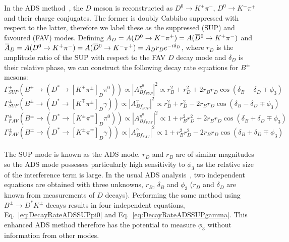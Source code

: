 \documentclass[oneside,12pt]{article}
\newcommand{\overbar}[1]{\mkern 1.5mu\overline{\mkern-1.5mu#1\mkern-1.5mu}\mkern
1.5mu}
\begin{document}
In the ADS method~\cite{ADSRef}, the $D$ meson is reconstructed as
$D^{0}\rightarrow K^{+}\pi^{-}$, $D^{0}\rightarrow K^{-}\pi^{+}$ and their
charge conjugates. The former is doubly Cabbibo suppressed with respect to the
latter, therefore we label these as the suppressed (SUP) and favoured (FAV)
modes. Defining $A_{D}=A(D^{0}\rightarrow
K^{-}\pi^{+})=A(\overbar{D}^{0}\rightarrow K^{+}\pi^{-})$ and $\overbar{A}_{D}=
A(D^{0}\rightarrow K^{+}\pi^{-})=A(\overbar{D}^{0}\rightarrow
K^{-}\pi^{+})=A_{D}r_{D}e^{-i\delta_{D}}$, where $r_{D}$ is the amplitude ratio
of the SUP with respect to the FAV $D$ decay mode and $\delta_{D}$ is their
relative phase, we can construct the following decay rate equations for
$B^{\pm}$ mesons:
  \begin{equation}
		\Gamma_{SUP}^{\pm}(B^{\pm}\rightarrow (D^{*}\rightarrow
[K^{\mp}\pi^{\pm}]_D\pi^{0}))\propto |A^{\pi^0}_{Bf_{SUP}}|^2 \propto r_{B}^{2}
+ r_{D}^{2} + 2r_{B}r_{D}\cos(\delta_{B} - \delta_{D} \mp \phi_{3})
\label{eq:DecayRateADSSUPpi0}
  \end{equation}
  \begin{equation}
		\Gamma_{SUP}^{\pm}(B^{\pm}\rightarrow (D^{*}\rightarrow
[K^{\mp}\pi^{\pm}]_D\gamma))\propto |A^{\gamma}_{Bf_{SUP}}|^2 \propto r_{B}^{2}
+ r_{D}^{2} - 2r_{B}r_{D}\cos(\delta_{B} - \delta_{D} \mp \phi_{3})
\label{eq:DecayRateADSSUPgamma}
  \end{equation}
  \begin{equation}
		\Gamma_{FAV}^{\pm}(B^{\pm}\rightarrow (D^{*}\rightarrow
[K^{\pm}\pi^{\mp}]_D\pi^{0}))\propto |A^{\pi^0}_{Bf_{FAV}}|^2 \propto 1 +
r_{B}^{2}r_{D}^{2} + 2r_{B}r_{D}\cos(\delta_{B} + \delta_{D} \mp \phi_{3})
\label{eq:DecayRateADSFAVpi0}
  \end{equation}
  \begin{equation}
		\Gamma_{FAV}^{\pm}(B^{\pm}\rightarrow (D^{*}\rightarrow
[K^{\pm}\pi^{\mp}]_D\gamma))\propto |A^{\gamma}_{Bf_{FAV}}|^2 \propto 1 +
r_{B}^{2}r_{D}^{2} - 2r_{B}r_{D}\cos(\delta_{B} + \delta_{D} \mp \phi_{3})
\label{eq:DecayRateADSFAVgamma}
  \end{equation}
\\
\noindent The SUP mode is known as the ADS mode. $r_{D}$ and $r_{B}$ are of
similar magnitudes so the ADS mode possesses particularly high sensitivity to
$\phi_3$ as the relative size of the interference term is large. In the usual
ADS analysis~\cite{ADSRef}, two independent equations are obtained with three
unknowns, $r_B$, $\delta_B$ and $\phi_3$ ($r_{D}$ and $\delta_D$ are known from
measurements of $D$ decays). Performing the same method using
$B^{\pm}\rightarrow D^{*}K^{\pm}$ decays results in four independent equations,
Eq.~\eqref{eq:DecayRateADSSUPpi0} and Eq.~\eqref{eq:DecayRateADSSUPgamma}. This
enhanced ADS method therefore has the potential to measure $\phi_3$ without
information from other modes.
\end{document}

